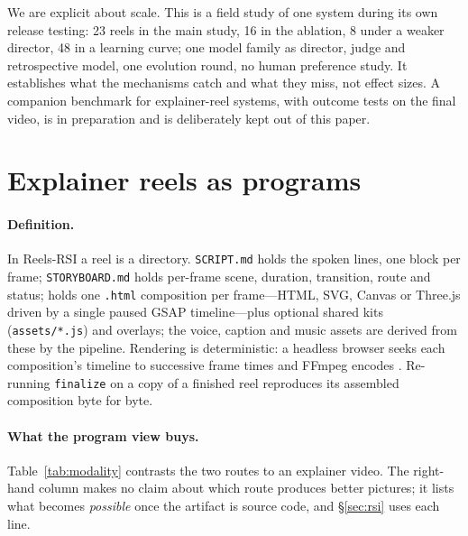 \documentclass[11pt]{article}
\newcommand{\sys}{Reels-RSI}
\begin{document}
We are explicit about scale. This is a field study of one system during its own release testing:
23 reels in the main study, 16 in the ablation, 8 under a weaker director, 48 in a learning curve; one model family as director, judge and retrospective
model, one evolution round, no human preference study. It establishes what the mechanisms catch and
what they miss, not effect sizes. A companion benchmark for explainer-reel systems, with outcome tests
on the final video, is in preparation and is deliberately kept out of this paper.

\section{Explainer reels as programs}
\label{sec:modality}

\paragraph{Definition.} In \sys{} a reel is a directory. \texttt{SCRIPT.md} holds the spoken lines,
one block per frame; \texttt{STORYBOARD.md} holds per-frame scene, duration, transition, route and
status;  holds one \texttt{.html} composition per frame---HTML, SVG,
Canvas or Three.js driven by a single paused GSAP timeline---plus optional shared kits
(\texttt{assets/*.js}) and overlays; the voice, caption and music assets are derived from these by
the pipeline. Rendering is deterministic: a headless browser seeks each composition's timeline to
successive frame times and FFmpeg encodes \citep{hyperframes}. Re-running \texttt{finalize} on a copy
of a finished reel reproduces its assembled composition byte for byte.

\paragraph{What the program view buys.} Table~\ref{tab:modality} contrasts the two routes to an
explainer video. The right-hand column makes no claim about which route produces better pictures;
it lists what becomes \emph{possible} once the artifact is source code, and \S\ref{sec:rsi} uses
each line.
\end{document}
